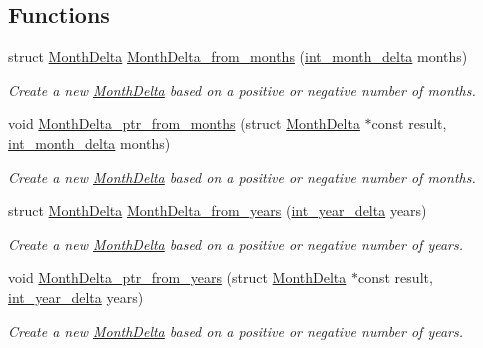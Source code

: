 \subsection*{Functions}
\begin{DoxyCompactItemize}
\item 
struct \hyperlink{structMonthDelta}{Month\-Delta} \hyperlink{month-delta_8h_a8dc3459876b9b81bc49a08ae48f082c7}{Month\-Delta\-\_\-from\-\_\-months} (\hyperlink{types_8h_adc711c00c117528b40875ad0119c687f}{int\-\_\-month\-\_\-delta} months)
\begin{DoxyCompactList}\small\item\em Create a new \hyperlink{structMonthDelta}{Month\-Delta} based on a positive or negative number of months. \end{DoxyCompactList}\item 
void \hyperlink{month-delta_8h_a553dc86fbe53a0e8c0510cb91b01e4d1}{Month\-Delta\-\_\-ptr\-\_\-from\-\_\-months} (struct \hyperlink{structMonthDelta}{Month\-Delta} $\ast$const result, \hyperlink{types_8h_adc711c00c117528b40875ad0119c687f}{int\-\_\-month\-\_\-delta} months)
\begin{DoxyCompactList}\small\item\em Create a new \hyperlink{structMonthDelta}{Month\-Delta} based on a positive or negative number of months. \end{DoxyCompactList}\item 
struct \hyperlink{structMonthDelta}{Month\-Delta} \hyperlink{month-delta_8h_a7ca04871efe6d13de16f7cadabec9642}{Month\-Delta\-\_\-from\-\_\-years} (\hyperlink{types_8h_ad2a6eecbd190f1ae0327acdeaf596623}{int\-\_\-year\-\_\-delta} years)
\begin{DoxyCompactList}\small\item\em Create a new \hyperlink{structMonthDelta}{Month\-Delta} based on a positive or negative number of years. \end{DoxyCompactList}\item 
void \hyperlink{month-delta_8h_a71953fe3cb271d22d7f5c1d15b72e4f9}{Month\-Delta\-\_\-ptr\-\_\-from\-\_\-years} (struct \hyperlink{structMonthDelta}{Month\-Delta} $\ast$const result, \hyperlink{types_8h_ad2a6eecbd190f1ae0327acdeaf596623}{int\-\_\-year\-\_\-delta} years)
\begin{DoxyCompactList}\small\item\em Create a new \hyperlink{structMonthDelta}{Month\-Delta} based on a positive or negative number of years. \end{DoxyCompactList}\item 

\end{DoxyCompactItemize}
